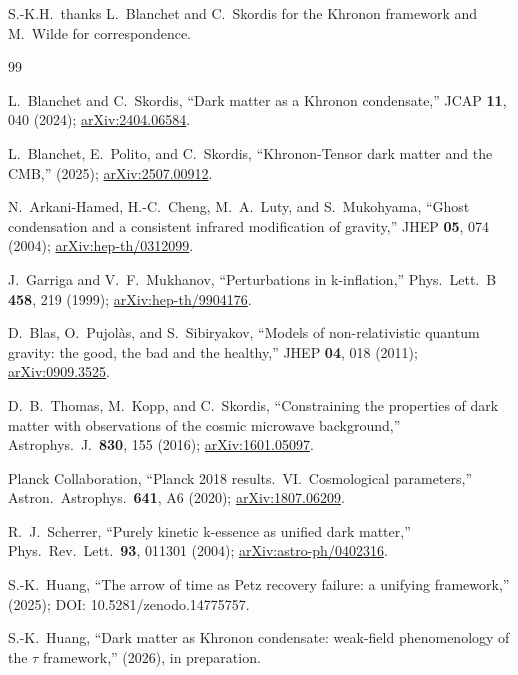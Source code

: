\documentclass[prd,twocolumn,superscriptaddress,longbibliography,floatfix]{revtex4-2}
\newcommand{\tauasym}{\tau}
\begin{document}
\begin{acknowledgments}
S.-K.H.\ thanks L.~Blanchet and C.~Skordis for the
Khronon framework and M.~Wilde for correspondence.
\end{acknowledgments}

\begin{thebibliography}{99}

L.~Blanchet and C.~Skordis,
``Dark matter as a Khronon condensate,''
JCAP \textbf{11}, 040 (2024);
\href{https://arxiv.org/abs/2404.06584}{arXiv:2404.06584}.

L.~Blanchet, E.~Polito, and C.~Skordis,
``Khronon-Tensor dark matter and the CMB,''
(2025);
\href{https://arxiv.org/abs/2507.00912}{arXiv:2507.00912}.

N.~Arkani-Hamed, H.-C.~Cheng, M.~A.~Luty,
and S.~Mukohyama,
``Ghost condensation and a consistent infrared
modification of gravity,''
JHEP \textbf{05}, 074 (2004);
\href{https://arxiv.org/abs/hep-th/0312099}{arXiv:hep-th/0312099}.

J.~Garriga and V.~F.~Mukhanov,
``Perturbations in k-inflation,''
Phys.\ Lett.\ B \textbf{458}, 219 (1999);
\href{https://arxiv.org/abs/hep-th/9904176}{arXiv:hep-th/9904176}.

D.~Blas, O.~Pujol\`{a}s, and S.~Sibiryakov,
``Models of non-relativistic quantum gravity:
the good, the bad and the healthy,''
JHEP \textbf{04}, 018 (2011);
\href{https://arxiv.org/abs/0909.3525}{arXiv:0909.3525}.

D.~B.~Thomas, M.~Kopp, and C.~Skordis,
``Constraining the properties of dark matter with
observations of the cosmic microwave background,''
Astrophys.\ J.\ \textbf{830}, 155 (2016);
\href{https://arxiv.org/abs/1601.05097}{arXiv:1601.05097}.

Planck Collaboration,
``Planck 2018 results.\ VI.\ Cosmological
parameters,''
Astron.\ Astrophys.\ \textbf{641}, A6 (2020);
\href{https://arxiv.org/abs/1807.06209}{arXiv:1807.06209}.

R.~J.~Scherrer,
``Purely kinetic k-essence as unified dark matter,''
Phys.\ Rev.\ Lett.\ \textbf{93}, 011301 (2004);
\href{https://arxiv.org/abs/astro-ph/0402316}{arXiv:astro-ph/0402316}.

S.-K.~Huang,
``The arrow of time as Petz recovery failure:
a unifying framework,''
(2025);
DOI: 10.5281/zenodo.14775757.

S.-K.~Huang,
``Dark matter as Khronon condensate: weak-field
phenomenology of the $\tauasym$ framework,''
(2026), in preparation.

\end{thebibliography}
\end{document}
